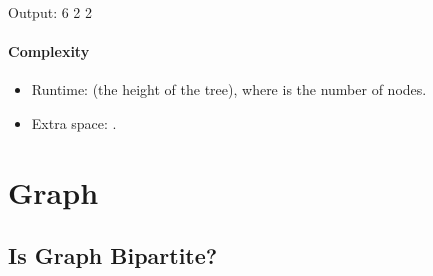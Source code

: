 \documentclass[letterpaper,12pt,english]{book}
\begin{document}
\begin{sphinxVerbatim}[commandchars=\\\{\}]
Output:
6
2
2
\end{sphinxVerbatim}


\subsubsection{Complexity}
\label{\detokenize{Binary_Tree/235_Lowest_Common_Ancestor_of_a_Binary_Search_Tree:complexity}}\begin{itemize}
\item {} 
\sphinxAtStartPar
Runtime:  (the height of the tree), where  is the number of nodes.

\item {} 
\sphinxAtStartPar
Extra space: .

\end{itemize}

\sphinxstepscope


\chapter{Graph}
\label{\detokenize{Graph/index:graph}}\label{\detokenize{Graph/index::doc}}
\sphinxstepscope


\section{Is Graph Bipartite?}
\label{\detokenize{Graph/785_Is_Graph_Bipartite:is-graph-bipartite}}\label{\detokenize{Graph/785_Is_Graph_Bipartite::doc}}
\end{document}
